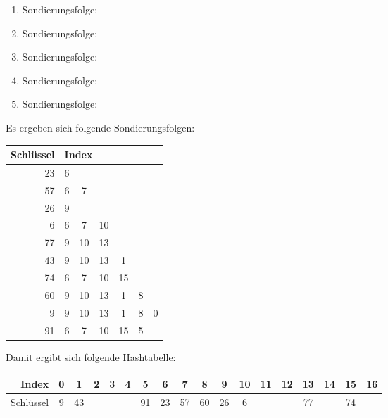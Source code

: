 \documentclass{lehramt-informatik-haupt}
\begin{document}
\begin{enumerate}
\begin{enumerate}
\begin{antwort}
\begin{enumerate}
\item Sondierungsfolge: \\

\item Sondierungsfolge: \\

\item Sondierungsfolge: \\

\item Sondierungsfolge: \\

\item Sondierungsfolge: \\
\end{enumerate}

\bigskip

Es ergeben sich folgende Sondierungsfolgen:

{
\setlength{\tabcolsep}{2pt}
\footnotesize

\begin{tabular}{r|cccccc}
Schlüssel & \multicolumn{6}{l}{Index}\\\hline
23 & 6\\
57 & 6 & 7\\
26 & 9\\
6  & 6 & 7 & 10 \\
77 & 9 & 10 & 13 \\
43 & 9 & 10 & 13 & 1 \\
74 & 6 & 7 & 10 & 15\\
60 & 9 & 10 & 13 & 1 & 8 \\
9  & 9 & 10 & 13 & 1 & 8 & 0\\
91 & 6 & 7 & 10 & 15 & 5\\
\end{tabular}

Damit ergibt sich folgende Hashtabelle:

\begin{tabular}{r|ccccccccccccccccc}
Index & 0 & 1 & 2 & 3 & 4 & 5 & 6 & 7 & 8 & 9 & 10 & 11 & 12 & 13 & 14 & 15 & 16 \\\hline
Schlüssel &9&43&&&&91&23&57&60&26&6&&&77&&74&\\
\end{tabular}
}
\end{antwort}
\end{enumerate}
\end{enumerate}
\end{document}
